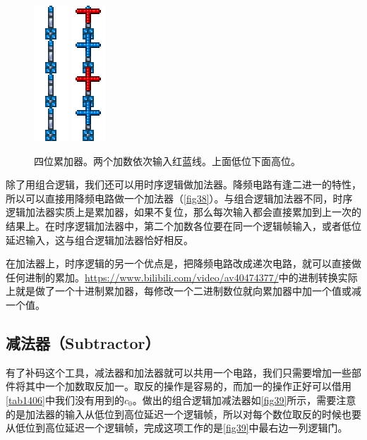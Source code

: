 \begin{figure}[!ht]
\centering
\includegraphics{images/410.png}
\qquad
\includegraphics{images/411.png}
\caption{四位累加器。两个加数依次输入红蓝线。上面低位下面高位。}\label{fig38}
\end{figure}

除了用组合逻辑，我们还可以用时序逻辑做加法器。降频电路有逢二进一的特性，所以可以直接用降频电路做一个加法器（\autoref{fig38}）。与组合逻辑加法器不同，时序逻辑加法器实质上是累加器，如果不复位，那么每次输入都会直接累加到上一次的结果上。在时序逻辑加法器中，第二个加数各位要在同一个逻辑帧输入，或者低位延迟输入，这与组合逻辑加法器恰好相反。

在加法器上，时序逻辑的另一个优点是，把降频电路改成递次电路，就可以直接做任何进制的累加。\url{https://www.bilibili.com/video/av40474377/}中的进制转换实际上就是做了一个十进制累加器，每修改一个二进制数位就向累加器中加一个值或减一个值。

\subsection{减法器（Subtractor）}
有了补码这个工具，减法器和加法器就可以共用一个电路，我们只需要增加一些部件将其中一个加数取反加一。取反的操作是容易的，而加一的操作正好可以借用\autoref{tab1406}中我们没有用到的$c_0$。做出的组合逻辑加减法器如\autoref{fig39}所示，需要注意的是加法器的输入从低位到高位延迟一个逻辑帧，所以对每个数位取反的时候也要从低位到高位延迟一个逻辑帧，完成这项工作的是\autoref{fig39}中最右边一列逻辑门。

